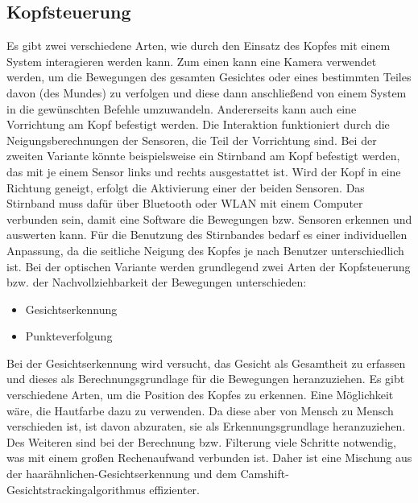 \subsection{Kopfsteuerung}

Es gibt zwei verschiedene Arten, wie durch den Einsatz des Kopfes mit einem System interagieren werden kann. Zum einen kann eine Kamera verwendet werden, um die Bewegungen des gesamten Gesichtes oder eines bestimmten Teiles davon (\zB des Mundes) zu verfolgen und diese dann anschließend von einem System in die gewünschten Befehle umzuwandeln. Andererseits kann auch eine Vorrichtung am Kopf befestigt werden. Die Interaktion funktioniert durch die Neigungsberechnungen der Sensoren, die Teil der Vorrichtung sind.
\newline \newline
Bei der zweiten Variante könnte beispielsweise ein Stirnband am Kopf befestigt werden, das mit je einem Sensor links und rechts ausgestattet ist. Wird der Kopf in eine Richtung geneigt, erfolgt die Aktivierung einer der beiden Sensoren. Das Stirnband muss dafür über Bluetooth oder WLAN mit einem Computer verbunden sein, damit eine Software die Bewegungen bzw. Sensoren erkennen und auswerten kann. Für die Benutzung des Stirnbandes bedarf es einer individuellen Anpassung, da die seitliche Neigung des Kopfes je nach Benutzer unterschiedlich ist.
\newline \newline
Bei der optischen Variante werden grundlegend zwei Arten der Kopfsteuerung bzw. der Nachvollziehbarkeit der Bewegungen unterschieden:
\begin{itemize}
      \item Gesichtserkennung
      \item Punkteverfolgung
\end{itemize}
\vspace{\baselineskip}
Bei der Gesichtserkennung wird versucht, das Gesicht als Gesamtheit zu erfassen und dieses als Berechnungsgrundlage für die Bewegungen heranzuziehen. Es gibt verschiedene Arten, um die Position des Kopfes zu erkennen. Eine Möglichkeit wäre, die Hautfarbe dazu zu verwenden. Da diese aber von Mensch zu Mensch verschieden ist, ist davon abzuraten, sie als Erkennungsgrundlage heranzuziehen. Des Weiteren sind bei der Berechnung bzw. Filterung viele Schritte notwendig, was mit einem großen \mbox{Rechenaufwand} verbunden ist. Daher ist eine Mischung aus der haarähnlichen-Gesichtserkennung und dem Camshift-Gesichtstrackingalgorithmus effizienter.
